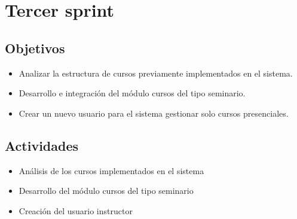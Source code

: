 ﻿\section{Tercer sprint} %
\label{sec:tercer_sprint}

\subsection{Objetivos}

\begin{itemize}
	\item Analizar la estructura de cursos previamente implementados en el sistema.
	\item Desarrollo e integración del módulo cursos del tipo seminario.
	\item Crear un nuevo usuario para el sistema gestionar solo cursos presenciales.
\end{itemize}

\subsection{Actividades} %
\label{sub:actividades3}

\begin{itemize}

\item Análisis de los cursos implementados en el sistema
\item Desarrollo del módulo cursos del tipo seminario
\item Creación del usuario instructor

\end{itemize}



